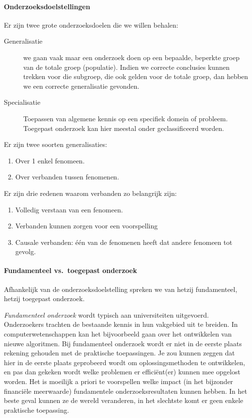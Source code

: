 \paragraph{Onderzoeksdoelstellingen}

Er zijn twee grote onderzoeksdoelen die we willen behalen:

\begin{description}
  \item [Generalisatie] we gaan vaak maar een onderzoek doen op een bepaalde, beperkte groep van de totale groep (populatie). Indien we correcte conclusies kunnen trekken voor die subgroep, die ook gelden voor de totale groep, dan hebben we een correcte generalisatie gevonden.
  \item[Specialisatie] Toepassen van algemene kennis op een specifiek domein of probleem. Toegepast onderzoek kan hier meestal onder geclassificeerd worden.
\end{description}

Er zijn twee soorten generalisaties:
\begin{enumerate}
  \item Over 1 enkel fenomeen.
  \item Over verbanden tussen fenomenen.
\end{enumerate}
Er zijn drie redenen waarom verbanden zo belangrijk zijn:
\begin{enumerate}
  \item Volledig verstaan van een fenomeen. 
  \item Verbanden kunnen zorgen voor een voorspelling
  \item Causale verbanden: één van de fenomenen heeft dat andere fenomeen tot gevolg. 
\end{enumerate}

\paragraph{Fundamenteel vs.~toegepast onderzoek}

Afhankelijk van de onderzoeksdoelstelling spreken we van hetzij fundamenteel, hetzij toegepast onderzoek.

\emph{Fundamenteel onderzoek} wordt typisch aan universiteiten uitgevoerd. Onderzoekers trachten de bestaande kennis in hun vakgebied uit te breiden. In computerwetenschappen kan het bijvoorbeeld gaan over het ontwikkelen van nieuwe algoritmen. Bij fundamenteel onderzoek wordt er niet in de eerste plaats rekening gehouden met de praktische toepassingen. Je zou kunnen zeggen dat hier in de eerste plaats geprobeerd wordt om oplossingsmethoden te ontwikkelen, en pas dan gekeken wordt welke problemen er efficiënt(er) kunnen mee opgelost worden. Het is moeilijk a priori te voorspellen welke impact (in het bijzonder financiële meerwaarde) fundamentele onderzoeksresultaten kunnen hebben. In het beste geval kunnen ze de wereld veranderen, in het slechtste komt er geen enkele praktische toepassing.

